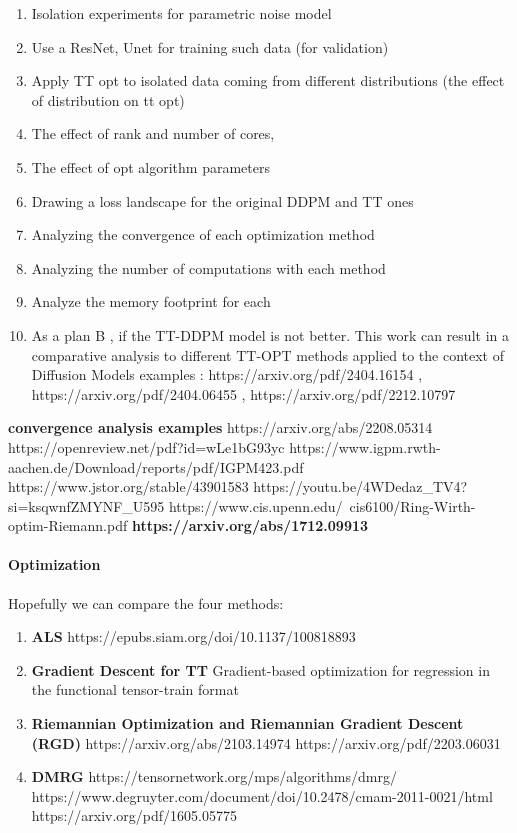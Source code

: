\documentclass[11pt]{article}
\begin{document}
    \begin{enumerate}
        \item Isolation experiments for parametric noise model
        \item Use a ResNet, Unet for training such data (for validation)
        \item Apply TT opt to isolated data coming from different distributions (the effect of distribution on tt opt)
        \item The effect of rank and number of cores,
        \item The effect of opt algorithm parameters
        \item Drawing a loss landscape for the original DDPM and TT ones
        \item Analyzing the convergence of each optimization method
        \item Analyzing the number of computations with each method
        \item Analyze the memory footprint for each
        \item As a plan B , if the TT-DDPM model is not better.
        This work can result in a comparative analysis to different TT-OPT methods applied to the context of Diffusion Models
        examples : https://arxiv.org/pdf/2404.16154 , https://arxiv.org/pdf/2404.06455 , https://arxiv.org/pdf/2212.10797

    \end{enumerate}
    \textbf{convergence analysis examples}
    https://arxiv.org/abs/2208.05314
    https://openreview.net/pdf?id=wLe1bG93yc
    https://www.igpm.rwth-aachen.de/Download/reports/pdf/IGPM423.pdf
    https://www.jstor.org/stable/43901583
    https://youtu.be/4WDedaz_TV4?si=ksqwnfZMYNF_U595
    https://www.cis.upenn.edu/~cis6100/Ring-Wirth-optim-Riemann.pdf
    \textbf{https://arxiv.org/abs/1712.09913}


    \paragraph{Optimization}
    Hopefully we can compare the four methods:
    \begin{enumerate}
        \item \textbf{ALS}  https://epubs.siam.org/doi/10.1137/100818893
        \item \textbf{Gradient Descent for TT} Gradient-based optimization for regression in the functional tensor-train format
        \item \textbf{Riemannian Optimization and Riemannian Gradient Descent (RGD)}
        https://arxiv.org/abs/2103.14974
        https://arxiv.org/pdf/2203.06031
        \item \textbf{DMRG}
        https://tensornetwork.org/mps/algorithms/dmrg/
        https://www.degruyter.com/document/doi/10.2478/cmam-2011-0021/html
        https://arxiv.org/pdf/1605.05775
    \end{enumerate}
\end{document}
